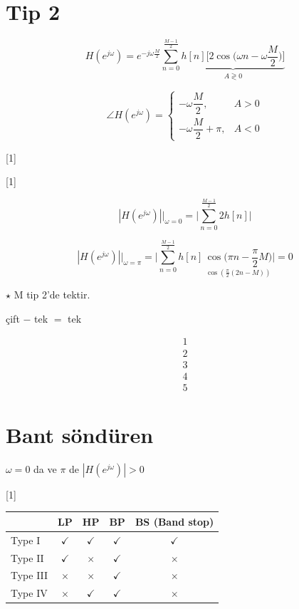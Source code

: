 \documentclass[11pt,a4paper]{article}
\begin{document}

\section{Tip 2}

\[ H(e^{j\omega}) = e^{-j\omega\frac{M}{2}} \sum_{n=0}^{\frac{M-1}{2}} \underbrace{h[n]\Big[2\cos\Big(\omega n - \omega\frac{M}{2}\Big)\Big]}_{A \gtrless 0} \]

\[ \angle H(e^{j\omega}) = \begin{cases} -\omega\dfrac{M}{2}, & A>0 \\[6pt] -\omega\dfrac{M}{2}+\pi, & A<0 \end{cases} \]

[1]

[1]

\[ |H(e^{j\omega})|\Big|_{\omega=0} = \Big|\sum_{n=0}^{\frac{M-1}{2}} 2h[n]\Big| \]

\[ |H(e^{j\omega})|\Big|_{\omega=\pi} = \Big|\sum_{n=0}^{\frac{M-1}{2}} h[n]\,\underset{\cos\left(\frac{\pi}{2}(2n-M)\right)}{\cos\Big(\pi n - \frac{\pi}{2}M\Big)}\Big| = 0 \]

$\star$ M tip 2'de tektir.

çift $-$ tek $=$ tek

\[ \begin{gathered} 1 \\ 2 \\ 3 \\ 4 \\ 5 \end{gathered} \]

\section{Bant söndüren}

$\omega=0$ da ve $\pi$ de $|H(e^{j\omega})|>0$

[1]

\begin{center}
\renewcommand{\arraystretch}{1.3}
\begin{tabular}{l|c|c|c|c}
 & LP & HP & BP & BS (Band stop) \\
\hline
Type I & $\checkmark$ & $\checkmark$ & $\checkmark$ & $\checkmark$ \\
\hline
Type II & $\checkmark$ & $\times$ & $\checkmark$ & $\times$ \\
\hline
Type III & $\times$ & $\times$ & $\checkmark$ & $\times$ \\
\hline
Type IV & $\times$ & $\checkmark$ & $\checkmark$ & $\times$ \\
\end{tabular}
\end{center}
\end{document}
